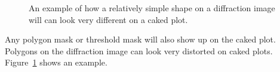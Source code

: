 \begin{figure}[htb]
    \centering
    \;\;
    \caption{An example of how a relatively simple
    shape on a diffraction image will can look very
    different on a caked plot.}
    \label{box_mask}
\end{figure}

Any polygon mask or threshold mask will also 
show up on the caked plot. Polygons on the 
diffraction image can look very distorted on 
caked plots. Figure~\ref{box_mask} shows an example.



